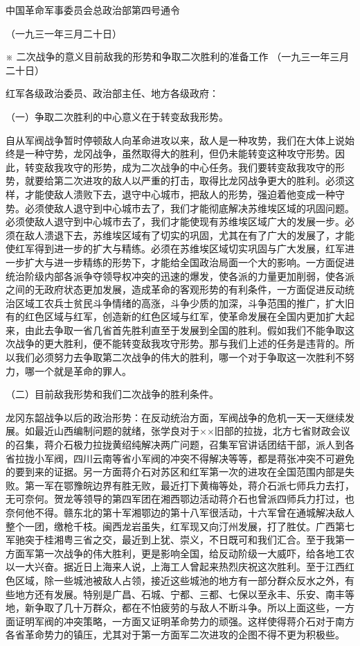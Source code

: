 中国革命军事委员会总政治部第四号通令

（一九三一年三月二十日）

※ 二次战争的意义目前敌我的形势和争取二次胜利的准备工作
（一九三一年三月二十日）



红军各级政治委员、政治部主任、地方各级政府：

（一）争取二次胜利的中心意义在于转变敌我形势。

自从军阀战争暂时停顿敌人向革命进攻以来，敌人是一种攻势，我们在大体上说始终是一种守势，龙冈战争，虽然取得大的胜利，但仍未能转变这种攻守形势。因此，转变敌我攻守的形势，成为二次战争的中心任务。我们要转变敌我攻守的形势，就要给第二次进攻的敌人以严重的打击，取得比龙冈战争更大的胜利。必须这样，才能使敌人溃败下去，退守中心城市，把敌人的形势，强迫着他变成一种守势。必须使敌人退守到中心城市去了，我们才能彻底解决苏维埃区域的巩固问题。必须使敌人退守到中心城市去了，我们才能使现有苏维埃区域广大的发展一步。必须在敌人溃退下去，苏维埃区域有了切实的巩固，尤其在有了广大的发展了，才能使红军得到进一步的扩大与精练。必须在苏维埃区域切实巩固与广大发展，红军进一步扩大与进一步精练的形势下，才能给全国政治局面一个大的影响。一方面促进统治阶级内部各派争夺领导权冲突的迅速的爆发，使各派的力量更加削弱，使各派之间的无政府状态更加发展，造成革命的客观形势的有利条件，一方面促进反动统治区域工农兵士贫民斗争情绪的高涨，斗争少质的加深，斗争范围的推广，扩大旧有的红色区域与红军，创造新的红色区域与红军，使革命发展在全国内更加扩大起来，由此去争取一省几省首先胜利直至于发展到全国的胜利。假如我们不能争取这次战争的更大胜利，便不能转变敌我攻守形势。那与我们上述的任务是违背的。所以我们必须努力去争取第二次战争的伟大的胜利，哪一个对于争取这一次胜利不努力，哪一个就是革命的罪人。

（二）目前敌我形势和我们二次战争的胜利条件。

龙冈东韶战争以后的政治形势：在反动统治方面，军阀战争的危机一天一天继续发展。如最近山西编制问题的就绪，张学良对于××旧部的拉拢，北方七省财政会议的召集，蒋介石极力拉拢黄绍纯解决两广问题，召集军官讲话团结干部，派人到各省拉拢小军阀，四川云南等省小军阀的冲突不得解决等等，都是蒋张冲突不可避免的要到来的证据。另一方面蒋介石对苏区和红军第一次的进攻在全国范围内部是失败。第一军在鄂豫皖边界有胜无败，最近打下黄梅等处，蒋介石派七师兵力去打，无可奈何。贺龙等领导的第四军团在湘西鄂边活动蒋介石也曾派四师兵力打过，也奈何他不得。赣东北的第十军湘鄂边的第十八军很活动，十六军曾在通城解决敌人整个一团，缴枪千枝。闽西龙岩虽失，红军现又向汀州发展，打了胜仗。广西第七军驰突于桂湘粤三省之交，最近到上犹、崇义，不日既可和我们汇合。至于我第一方面军第一次战争的伟大胜利，更是影响全国，给反动阶级一大威吓，给各地工农以一大兴奋。据近日上海来人说，上海工人曾起来热烈庆祝这次胜利。至于江西红色区域，除一些城池被敌人占领，接近这些城池的地方有一部分群众反水之外，有些地方还有发展。特别是广昌、石城、宁都、三都、七保以至永丰、乐安、南丰等地，新争取了几十万群众，都在不怕疲劳的与敌人不断斗争。所以上面这些，一方面证明军阀的冲突策略，一方面又证明革命势力的顽强。这样使得蒋介石对于南方各省革命势力的镇压，尤其对于第一方面军二次进攻的企图不得不更为积极些。


